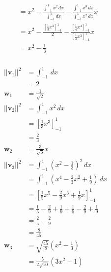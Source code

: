 \documentclass{article}
\begin{document}
\begin{align*}
               & = x^2 - \frac{\int_{-1}^1 x^2 \,dx}{\int_{-1}^1 dx} - \frac{\int_{-1}^1 x^3 \,dx}{\int_{-1}^1 x^2 \,dx} x                                                                                                                  \\
               & = x^2 - \frac{\left[ \frac{1}{3} x^3 \right]_{-1}^1}{2} - \frac{\left[ \frac{1}{4} x^4 \right]_{-1}^1}{\left[ \frac{1}{3} x^3 \right]_{-1}^1} x                                                                            \\
               & = x^2 - \frac{1}{3}
\end{align*}

\setcounter{subsubsection}{18}
\subsubsection{}

\begin{align*}
  ||\mathbf{v}_1||^2 & = \int_{-1}^1 \,dx                                                                  \\
                     & = 2                                                                                 \\
  \mathbf{w}_1       & = \frac{1}{\sqrt{2}}                                                                \\
  ||\mathbf{v}_2||^2 & = \int_{-1}^1 x^2 \,dx                                                              \\
                     & = \left[ \frac{1}{3} x^3 \right]_{-1}^1                                             \\
                     & = \frac{2}{3}                                                                       \\
  \mathbf{w}_2       & = \frac{3}{\sqrt{6}} x                                                              \\
  ||\mathbf{v}_3||^2 & = \int_{-1}^1 \left( x^2 - \frac{1}{3} \right)^2 \,dx                               \\
                     & = \int_{-1}^1 \left( x^4 - \frac{2}{3} x^2 + \frac{1}{9} \right) \,dx               \\
                     & = \left[ \frac{1}{5} x^5 - \frac{2}{9} x^3 + \frac{1}{9} x \right]_{-1}^1           \\
                     & = \frac{1}{5} - \frac{2}{9} + \frac{1}{9} + \frac{1}{5} - \frac{2}{9} + \frac{1}{9} \\
                     & = \frac{2}{5} - \frac{2}{9}                                                         \\
                     & = \frac{8}{45}                                                                      \\
  \mathbf{w}_3       & = \sqrt{\frac{45}{8}} \left( x^2 - \frac{1}{3} \right)                              \\
                     & = \frac{5}{2 \sqrt{10}} \left( 3 x^2 - 1 \right)
\end{align*}
\end{document}
